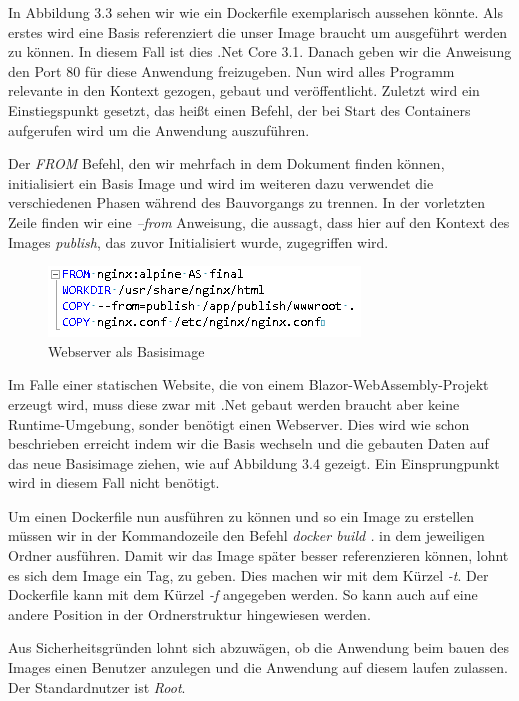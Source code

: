 \documentclass[12pt,a4paper]{scrartcl}
\begin{document}
In Abbildung 3.3 sehen wir wie ein Dockerfile exemplarisch aussehen könnte. Als erstes wird eine Basis referenziert die unser Image braucht um ausgeführt werden zu können. In diesem Fall ist dies .Net Core 3.1. Danach geben wir die Anweisung den Port 80 für diese Anwendung freizugeben. Nun wird alles Programm relevante in den Kontext gezogen, gebaut und veröffentlicht. Zuletzt wird ein Einstiegspunkt gesetzt, das heißt einen Befehl, der bei Start des Containers aufgerufen wird um die Anwendung auszuführen. 

Der \emph{FROM} Befehl, den wir mehrfach in dem Dokument finden können, initialisiert ein Basis Image und wird im weiteren dazu verwendet die verschiedenen Phasen während des Bauvorgangs zu trennen. In der vorletzten Zeile finden wir eine \emph{--from} Anweisung, die aussagt, dass hier auf den Kontext des Images \emph{publish}, das zuvor Initialisiert wurde, zugegriffen wird.

\begin{figure}[h!]
	\centering
	\includegraphics[scale=1]{DockerfileBlazor.png}
	\caption[Screenshot]{Webserver als Basisimage}
\end{figure}

Im Falle einer statischen Website, die von einem Blazor-WebAssembly-Projekt erzeugt wird, muss diese zwar mit .Net gebaut werden braucht aber keine Runtime-Umgebung, sonder benötigt einen Webserver.
Dies wird wie schon beschrieben erreicht indem wir die Basis wechseln und die gebauten Daten auf das neue Basisimage ziehen, wie auf Abbildung 3.4 gezeigt. Ein Einsprungpunkt wird in diesem Fall nicht benötigt.

Um einen Dockerfile nun ausführen zu können und so ein Image zu erstellen müssen wir in der Kommandozeile den Befehl \emph{docker build .} in dem jeweiligen Ordner ausführen. Damit wir das Image später besser referenzieren können, lohnt es sich dem Image ein Tag, zu geben. Dies machen wir mit dem Kürzel \emph{-t}. Der Dockerfile kann mit dem Kürzel \emph{-f} angegeben werden. So kann auch auf eine andere Position in der Ordnerstruktur hingewiesen werden.

Aus Sicherheitsgründen lohnt sich abzuwägen, ob die Anwendung beim bauen des Images einen Benutzer anzulegen und die Anwendung auf diesem laufen zulassen. Der Standardnutzer ist \emph{Root}.
\end{document}
